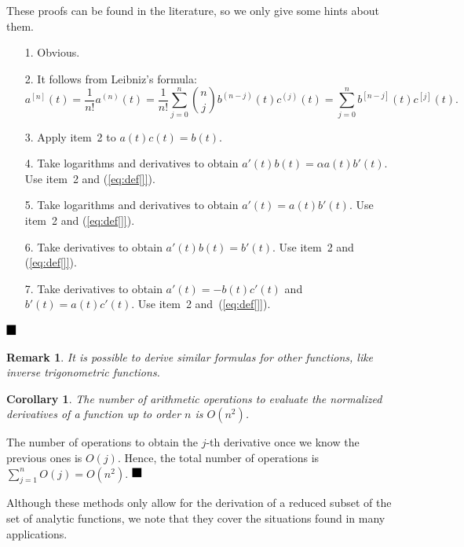 \documentclass[12pt,twoside]{article}
\newtheorem{corollary}{Corollary}[section]
\newtheorem{remark}{Remark}[section]
\newcommand{\bproof}{\noindent {\bf Proof:} }
\newcommand{\eproof}{\hfill $\rule{3mm}{3mm}$}
\begin{document}
\bproof These proofs can be found in the literature, so we only give
some hints about them.
\begin{itemize}
\renewcommand{\itemsep}{0pt}
\item[{\rm 1.}] Obvious.

\item[{\rm 2.}] It follows from Leibniz's formula:
   \[
   a^{[n]}(t)= \frac{1}{n!}a^{(n)}(t)=
   \frac{1}{n!}\sum_{j=0}^n {n\choose j} b^{(n-j)}(t)c^{(j)}(t)
    = \sum_{j=0}^n b^{[n-j]}(t)c^{[j]}(t).
   \]

\item[{\rm 3.}] Apply item~2 to $a(t)c(t)=b(t)$.

\item[{\rm 4.}] Take logarithms and derivatives to obtain
$a'(t)b(t)=\alpha a(t)b'(t)$. Use item~2 and (\ref{eq:def[]}).

\item[{\rm 5.}] Take logarithms and derivatives to obtain
$a'(t)=a(t)b'(t)$. Use item~2 and (\ref{eq:def[]}).

\item[{\rm 6.}] Take derivatives to obtain $a'(t)b(t)=b'(t)$. Use
item~2 and (\ref{eq:def[]}).

\item[{\rm 7.}] Take derivatives to obtain $a'(t)=-b(t)c'(t)$ and
$b'(t)=a(t)c'(t)$. Use item~2 and~(\ref{eq:def[]}).
\end{itemize}
\eproof

\begin{remark}
It is possible to derive similar formulas for other functions, like
inverse trigonometric functions.
\end{remark}

\begin{corollary}\label{coro:nu-op}
The number of arithmetic operations to evaluate the normalized
derivatives of a function up to order $n$ is $O(n^2)$.
\end{corollary}

\bproof The number of operations to obtain the $j$-th derivative once
we know the previous ones is $O(j)$. Hence, the total number of
operations is $\sum_{j=1}^n O(j)=O(n^2)$.
\eproof

\medskip

Although these methods only allow for the derivation of a reduced
subset of the set of analytic functions, we note that they cover the
situations found in many applications.
\end{document}
